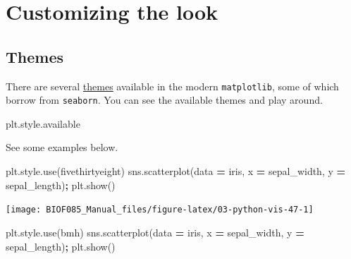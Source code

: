 \documentclass[
  letterpaper,
]{scrbook}
\newenvironment{Shaded}{\begin{snugshade}}{\end{snugshade}}
\newcommand{\NormalTok}[1]{#1}
\newcommand{\OperatorTok}[1]{\textcolor[rgb]{0.81,0.36,0.00}{\textbf{#1}}}
\newcommand{\StringTok}[1]{\textcolor[rgb]{0.31,0.60,0.02}{#1}}
\begin{document}
\hypertarget{customizing-the-look}{%
\section{Customizing the look}\label{customizing-the-look}}

\hypertarget{themes}{%
\subsection{Themes}\label{themes}}

There are several \href{https://matplotlib.org/3.2.1/gallery/style_sheets/style_sheets_reference.html}{themes} available in the modern \texttt{matplotlib}, some of which borrow from \texttt{seaborn}. You can see the available themes and play around.

\begin{Shaded}
\begin{Highlighting}[]
\NormalTok{plt.style.available}
\end{Highlighting}
\end{Shaded}

See some examples below.

\begin{Shaded}
\begin{Highlighting}[]
\NormalTok{plt.style.use(}\StringTok{\textquotesingle{}fivethirtyeight\textquotesingle{}}\NormalTok{)}
\NormalTok{sns.scatterplot(data }\OperatorTok{=}\NormalTok{ iris, x }\OperatorTok{=} \StringTok{\textquotesingle{}sepal\_width\textquotesingle{}}\NormalTok{, y }\OperatorTok{=} \StringTok{\textquotesingle{}sepal\_length\textquotesingle{}}\NormalTok{)}\OperatorTok{;}
\NormalTok{plt.show()}
\end{Highlighting}
\end{Shaded}

\begin{center}\texttt{[image: BIOF085\_Manual\_files/figure-latex/03-python-vis-47-1]} \end{center}

\begin{Shaded}
\begin{Highlighting}[]
\NormalTok{plt.style.use(}\StringTok{\textquotesingle{}bmh\textquotesingle{}}\NormalTok{)}
\NormalTok{sns.scatterplot(data }\OperatorTok{=}\NormalTok{ iris, x }\OperatorTok{=} \StringTok{\textquotesingle{}sepal\_width\textquotesingle{}}\NormalTok{, y }\OperatorTok{=} \StringTok{\textquotesingle{}sepal\_length\textquotesingle{}}\NormalTok{)}\OperatorTok{;}
\NormalTok{plt.show()}
\end{Highlighting}
\end{Shaded}
\end{document}
